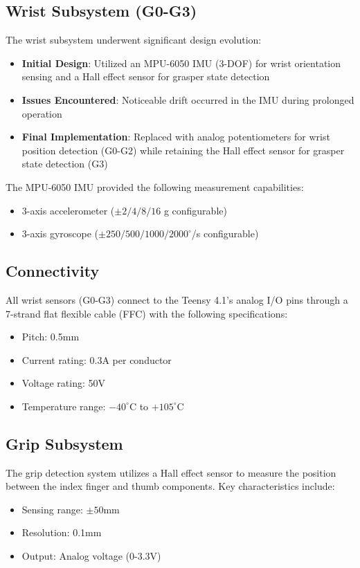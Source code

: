 \subsection{Wrist Subsystem (G0-G3)}
The wrist subsystem underwent significant design evolution:
\begin{itemize}
    \item \textbf{Initial Design}: Utilized an MPU-6050 IMU (3-DOF) for wrist orientation sensing and a Hall effect sensor for grasper state detection
    \item \textbf{Issues Encountered}: Noticeable drift occurred in the IMU during prolonged operation
    \item \textbf{Final Implementation}: Replaced with analog potentiometers for wrist position detection (G0-G2) while retaining the Hall effect sensor for grasper state detection (G3)
\end{itemize}

The MPU-6050 IMU provided the following measurement capabilities:
\begin{itemize}
    \item 3-axis accelerometer ($\pm 2/4/8/16$ g configurable)
    \item 3-axis gyroscope ($\pm 250/500/1000/2000^\circ$/s configurable)
\end{itemize}

\subsection{Connectivity}
All wrist sensors (G0-G3) connect to the Teensy 4.1's analog I/O pins through a 7-strand flat flexible cable (FFC) with the following specifications:
\begin{itemize}
    \item Pitch: 0.5mm
    \item Current rating: 0.3A per conductor
    \item Voltage rating: 50V
    \item Temperature range: $-40^\circ$C to $+105^\circ$C
\end{itemize}

\subsection{Grip Subsystem}
The grip detection system utilizes a Hall effect sensor to measure the position between the index finger and thumb components. Key characteristics include:
\begin{itemize}
    \item Sensing range: $\pm 50$mm
    \item Resolution: 0.1mm
    \item Output: Analog voltage (0-3.3V)
\end{itemize}

